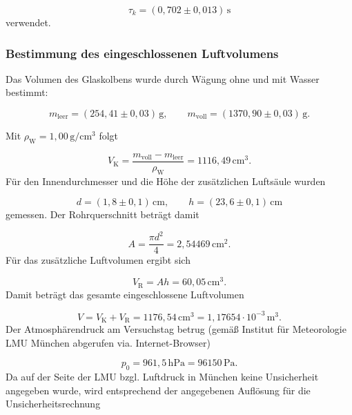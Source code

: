 \documentclass{report}
\begin{document}
\begin{equation}
\boxed{\tau_k=(0{,}702\pm0{,}013)\,\mathrm{s}}
\end{equation}
\noindent
verwendet.


\subsubsection{Bestimmung des eingeschlossenen Luftvolumens}
\noindent
Das Volumen des Glaskolbens wurde durch Wägung ohne und mit Wasser bestimmt:

\begin{equation}
m_\mathrm{leer}=(254{,}41\pm0{,}03)\,\mathrm{g},
\qquad
m_\mathrm{voll}=(1370{,}90\pm0{,}03)\,\mathrm{g}.
\end{equation}

Mit $\rho_\mathrm{W}=1{,}00\,\mathrm{g/cm^3}$ folgt

\begin{equation}
V_\mathrm{K}
=
\frac{m_\mathrm{voll}-m_\mathrm{leer}}{\rho_\mathrm{W}}
=
1116{,}49\,\mathrm{cm^3}.
\end{equation}
\noindent
Für den Innendurchmesser und die Höhe der zusätzlichen Luftsäule wurden

\begin{equation}
d=(1{,}8\pm0{,}1)\,\mathrm{cm},
\qquad
h=(23{,}6\pm0{,}1)\,\mathrm{cm}
\end{equation}
\noindent
gemessen. Der Rohrquerschnitt beträgt damit

\begin{equation}
A=\frac{\pi d^2}{4}
=
2{,}54469\,\mathrm{cm^2}.
\end{equation}
\noindent
Für das zusätzliche Luftvolumen ergibt sich

\begin{equation}
V_\mathrm{R}=Ah
=
60{,}05\,\mathrm{cm^3}.
\end{equation}
\noindent
Damit beträgt das gesamte eingeschlossene Luftvolumen

\begin{equation}
\boxed{
V=V_\mathrm{K}+V_\mathrm{R}
=
1176{,}54\,\mathrm{cm^3}
=
1{,}17654\cdot10^{-3}\,\mathrm{m^3}
}.
\end{equation}
\noindent
Der Atmosphärendruck am Versuchstag betrug (gemäß Institut für Meteorologie LMU München abgerufen via. Internet-Browser)

\begin{equation}
p_0=961{,}5\,\mathrm{hPa}
=96150\,\mathrm{Pa}.
\end{equation}
\noindent
Da auf der Seite der LMU bzgl. Luftdruck in München keine Unsicherheit angegeben wurde, wird entsprechend der angegebenen
Auflösung für die Unsicherheitsrechnung
\end{document}
